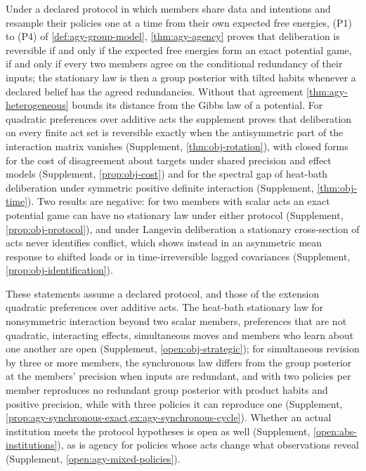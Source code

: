 Under a declared protocol in which members share data and intentions and resample their policies one at a time from their own expected free energies, (P1) to (P4) of \cref{def:agy-group-model}, \cref{thm:agy-agency} proves that deliberation is reversible if and only if the expected free energies form an exact potential game, if and only if every two members agree on the conditional redundancy of their inputs; the stationary law is then a group posterior with tilted habits whenever a declared belief has the agreed redundancies. Without that agreement \cref{thm:agy-heterogeneous} bounds its distance from the Gibbs law of a potential. For quadratic preferences over additive acts the supplement proves that deliberation on every finite act set is reversible exactly when the antisymmetric part of the interaction matrix vanishes (Supplement, \cref{thm:obj-rotation}), with closed forms for the cost of disagreement about targets under shared precision and effect models (Supplement, \cref{prop:obj-cost}) and for the spectral gap of heat-bath deliberation under symmetric positive definite interaction (Supplement, \cref{thm:obj-time}). Two results are negative: for two members with scalar acts an exact potential game can have no stationary law under either protocol (Supplement, \cref{prop:obj-protocol}), and under Langevin deliberation a stationary cross-section of acts never identifies conflict, which shows instead in an asymmetric mean response to shifted loads or in time-irreversible lagged covariances (Supplement, \cref{prop:obj-identification}).

These statements assume a declared protocol, and those of the extension quadratic preferences over additive acts. The heat-bath stationary law for nonsymmetric interaction beyond two scalar members, preferences that are not quadratic, interacting effects, simultaneous moves and members who learn about one another are open (Supplement, \cref{open:obj-strategic}); for simultaneous revision by three or more members, the synchronous law differs from the group posterior at the members' precision when inputs are redundant, and with two policies per member reproduces no redundant group posterior with product habits and positive precision, while with three policies it can reproduce one (Supplement, \cref{prop:agy-synchronous-exact,ex:agy-synchronous-cycle}). Whether an actual institution meets the protocol hypotheses is open as well (Supplement, \cref{open:abs-institutions}), as is agency for policies whose acts change what observations reveal (Supplement, \cref{open:agy-mixed-policies}).

